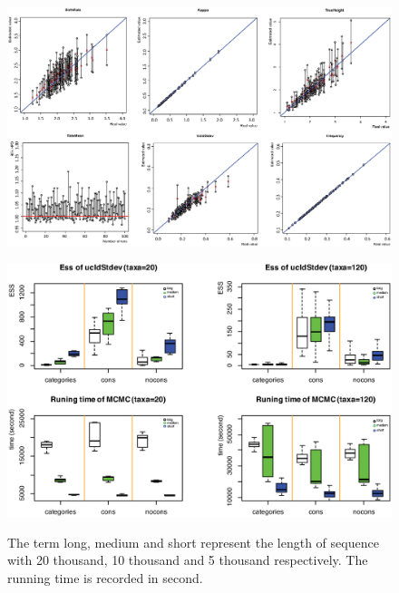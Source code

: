 \documentclass{bmcart}
\begin{document}
\begin{backmatter}
\begin{figure}[h!]
\includegraphics[width=12cm]{LargeTree.eps}\\
\caption{
             }
\label{LargeTree}
\end{figure}

\begin{figure}[h!]
\includegraphics[width=12cm]{Efficiency.eps}\\
\caption{
             The term long, medium and short represent the length of sequence with 20 thousand, 10 thousand and 5 thousand respectively. The running time is recorded in second.}
\label{eff_comp}
\end{figure}


\end{backmatter}
\end{document}
